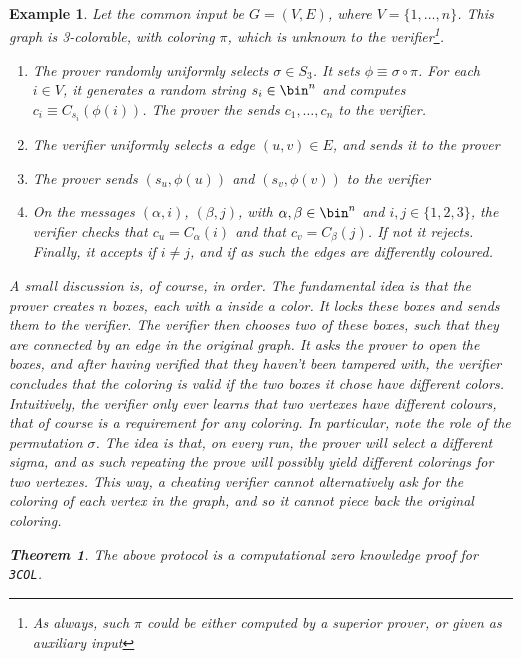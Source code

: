 \documentclass{article}
\newtheorem{theorem}{Theorem}
\newtheorem{example}{Example}
\begin{document}
\begin{example}
    Let the common input be $G = (V, E)$, where $V = \{1, \dots, n \}$.
    This graph is 3-colorable, with coloring $\pi$, which is unknown to the verifier\footnote{As always, such $\pi$ could be either computed by a superior prover, or given as auxiliary input}. 
    \begin{enumerate}
        \item The prover randomly uniformly selects $\sigma \in S_3$. It sets $\phi \equiv \sigma \circ \pi$.
                For each $i \in V$, it generates a random string $s_i \in \bin^n$ and computes $c_i \equiv C_{s_i}(\phi(i))$.
                The prover the sends $c_1, \dots, c_n$ to the verifier.
        \item The verifier uniformly selects a edge $(u, v) \in E$, and sends it to the prover
        \item The prover sends $(s_u, \phi(u))$ and $(s_v, \phi(v))$ to the verifier
        \item On the messages $(\alpha, i)$, $(\beta, j)$, with $\alpha, \beta \in \bin^n$ and $i, j \in  \{1, 2, 3\}$, the verifier checks that $c_u = C_\alpha(i)$ and that 
                $c_v = C_\beta(j)$. If not it rejects. Finally, it accepts if $i \neq j$, and if as such the edges are differently coloured.
    \end{enumerate}
    A small discussion is, of course, in order. The fundamental idea is that the prover creates $n$ boxes, each with a inside a color.
    It locks these boxes and sends them to the verifier. The verifier then chooses two of these boxes, such that they are connected by an edge in the original graph.
    It asks the prover to open the boxes, and after having verified that they haven't been tampered with, the verifier concludes that the coloring is valid if the two boxes it chose have different colors.
    Intuitively, the verifier only ever learns that two vertexes have different colours, that of course is a requirement for any coloring.
    In particular, note the role of the permutation $\sigma$. The idea is that, on every run, the prover will select a different sigma, and as such
    repeating the prove will possibly yield different colorings for two vertexes. This way, a cheating verifier cannot alternatively ask for the coloring 
    of each vertex in the graph, and so it cannot piece back the original coloring.
    \begin{theorem}
        The above protocol is a computational zero knowledge proof for \texttt{3COL}.
    \end{theorem}

\end{example}
\end{document}
